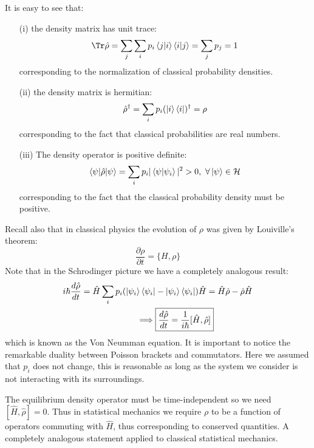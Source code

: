 \documentclass[a4paper,11pt,oneside]{book}
\begin{document}
It is easy to see that:
\begin{enumerate}
    \item[(i)] the density matrix has unit trace:
    \begin{equation}
        \Tr \hat{\rho} = \sum_j \sum_i p_i \braket{j|i}\braket{i|j} = \sum_j p_j = 1
    \end{equation}
    corresponding to the normalization of classical probability densities.
    \item[(ii)] the density matrix is hermitian:
    \begin{equation}
        \hat{\rho}^\dagger = \sum_i p_i (\ket{i} \bra{i})^\dagger = \rho
    \end{equation}
    corresponding to the fact that classical probabilities are real numbers.
    \item[(iii)] The density operator is positive definite:
        \begin{equation}
         \braket{\psi|\hat{\rho}|\psi} = \sum_i p_i |\braket{\psi|\psi_i}|^2>0, \ \forall \ket{\psi} \in \mathcal{H}
        \end{equation}
        corresponding to the fact that the classical probability density must be positive.
\end{enumerate}
Recall also that in classical physics the evolution of $\rho$ was given by Louiville's theorem:
\begin{equation}
    \frac{\partial \rho}{\partial t} = \{H,\rho\}
\end{equation}
Note that in the Schrodinger picture we have a completely analogous result:
\begin{align}
    i \hbar \frac{d\hat{\rho}}{dt} = \hat{H} \sum_i p_i(\ket{\psi_i} \bra{\psi_i} &- \ket{\psi_i}\bra{\psi_i})\hat{H} = \hat{H} \hat{\rho} - \hat{\rho}\hat{H}\\
    \implies& \boxed{\frac{d \hat{\rho}}{dt} = \frac{1}{i\hbar}[\hat{H},\hat{\rho}]}
\end{align}
which is known as the Von Neumman equation. It is important to notice the remarkable duality between Poisson brackets and commutators. Here we assumed that $p_i$ does not change, this is reasonable as long as the system we consider is not interacting with its surroundings. 

The equilibrium density operator must be time-independent so we need $[\hat{H},\hat{\rho}]=0$. Thus in statistical mechanics we require $\rho$ to be a function of operators commuting with $\hat{H}$, thus corresponding to conserved quantities. A completely analogous statement applied to classical statistical mechanics.
\end{document}
